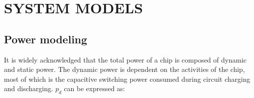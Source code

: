 \section{SYSTEM MODELS}

\subsection{Power modeling}

It is widely acknowledged that the total power of a chip is composed of dynamic and static power. The dynamic power is dependent on the activities of the chip, most of which is the capacitive switching power consumed during circuit charging and discharging. $p_{d}$ can be expressed as:



